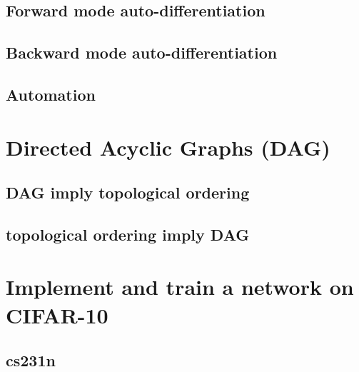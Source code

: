 \documentclass[11pt,english]{article}
\begin{document}
\pagebreak

    \subsection{Forward mode auto-differentiation}
    

\pagebreak

    \subsection{Backward mode auto-differentiation}
    

\pagebreak

    \subsection{Automation}
    

\pagebreak

    \section{Directed Acyclic Graphs (DAG)}
    \subsection{DAG imply topological ordering}
    

\pagebreak

    \subsection{topological ordering imply DAG}
    

\pagebreak

    \section{Implement and train a network on CIFAR-10}
    \subsection{cs231n}

    

    
\end{document}
